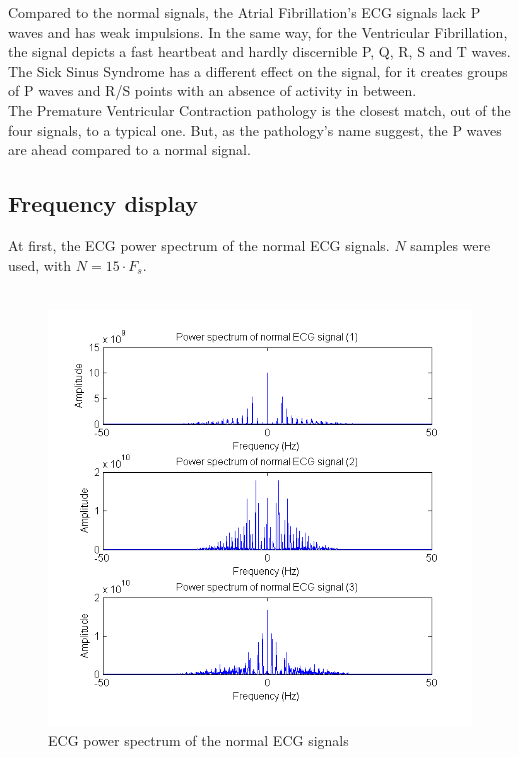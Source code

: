 \documentclass[11pt]{article}
\begin{document}
		Compared to the normal signals, the Atrial Fibrillation's ECG signals lack P waves and has weak impulsions. In the same way, for the Ventricular Fibrillation, the signal depicts a fast heartbeat and hardly discernible P, Q, R, S and T waves.\\
		The Sick Sinus Syndrome has a different effect on the signal, for it creates groups of P waves and R/S points with an absence of activity in between.\\
		The Premature Ventricular Contraction pathology is the closest match, out of the four signals, to a typical one. But, as the pathology's name suggest, the P waves are ahead compared to a normal signal.\\

	\subsection{Frequency display}
		At first, the ECG power spectrum of the normal ECG signals. $N$ samples were used, with $N = 15 \cdot F_s$.\\
		\\
		\begin{figure}[ht]
			\centering
			\includegraphics[scale=0.65]{images/Q321.png}
			\caption{ECG power spectrum of the normal ECG signals}
			\label{Q321}
		\end{figure}
\end{document}
